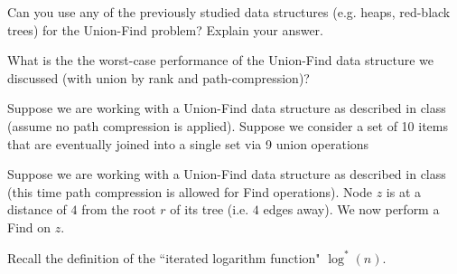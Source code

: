\documentclass[addpoints,12pt]{exam}
\begin{document}
\begin{questions}
\qformat{[UF\thequestion]}

\question
Can you use any of the previously studied data structures (e.g. heaps, red-black trees) for the Union-Find problem? Explain your answer.

\question
What is the the worst-case performance of the Union-Find data structure we discussed (with union by rank and path-compression)?

\question
Suppose we are working with a Union-Find data structure as described in class (assume no path
compression is applied). Suppose we consider a set of 10 items that are eventually joined into a single
set via 9 union operations

\question
Suppose we are working with a Union-Find data structure as described in class (this time path compression is allowed for Find operations). 
Node $z$ is at a distance of $4$ from the root $r$ of its tree (i.e.  $4$ edges away). We now perform a Find on $z$.

\question
Recall the definition of the ``iterated logarithm function" $\log^{*}(n)$. 
\end{questions}
\end{document}
